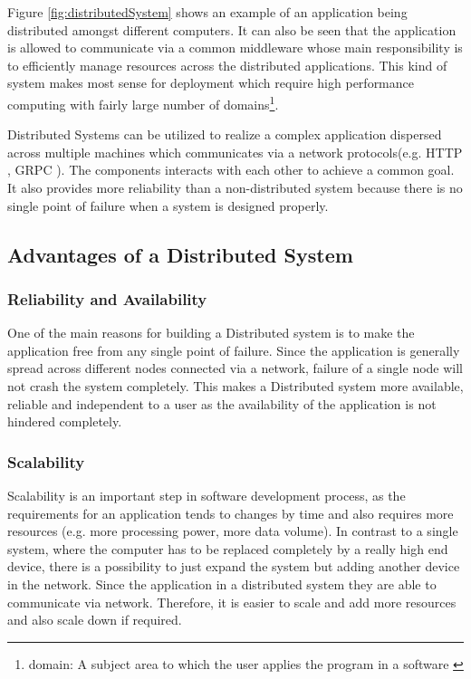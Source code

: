     \par
        Figure \ref{fig:distributedSystem} shows an example of an application being 
        distributed amongst different computers. It can also be seen that the application
        is allowed to communicate via a common middleware whose main responsibility is to
        efficiently manage resources across the distributed applications. This kind of system
        makes most sense for deployment which require high performance computing with fairly
        large number of domains\footnote{domain: A subject area to which the user applies the program in a 
        software \cite{DDD}}.

    \par
        Distributed Systems can be utilized to realize a complex application dispersed across
        multiple machines which communicates via a network protocols(e.g. HTTP \cite{HTTP}, 
        GRPC \cite{grpc}). The 
        components interacts with each other to achieve a common goal. It also provides
        more reliability than a non-distributed system because there is no single point
        of failure when a system is designed properly. 

    
        
    \subsection{Advantages of a Distributed System} 
        \subsubsection{Reliability and Availability}
        One of the main reasons for building a Distributed system is to make the application free from any single point of failure.
        Since the application is generally spread across different nodes connected via a network, failure of a single node will not 
        crash the system completely. This makes a Distributed system more available, reliable and independent to a user as the availability
        of the application is not hindered completely.
        
        \subsubsection{Scalability}
        Scalability is an important step in software development process, as the requirements for an application tends to changes by time and also requires more resources
        (e.g. more processing power, more data volume). 
        In contrast to a single system, where the computer 
        has to be replaced completely by a really high end device, there is a possibility to just expand the system but adding another device in the network.
        Since the application in a distributed system they are able to communicate via network. Therefore, it is easier to scale and add more resources and 
        also scale down if required. 
    
